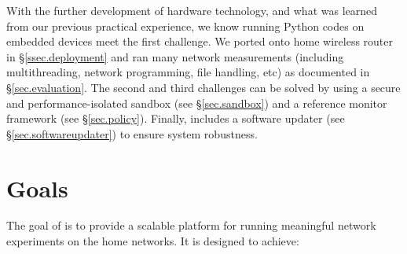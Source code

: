 With the further development of hardware technology, and what was learned from our previous practical experience, we know running Python codes on embedded devices meet the first challenge. We ported \sysname onto home wireless router in \S{\ref{ssec.deployment}} and ran many network measurements (including multithreading, network programming, file handling, etc) as documented in \S{\ref{sec.evaluation}}. The second and third challenges can be solved by using a secure and performance-isolated sandbox (see \S{\ref{sec.sandbox}}) and a reference monitor framework (see \S{\ref{sec.policy}}). Finally, \sysname includes a software updater (see \S{\ref{sec.softwareupdater}}) to ensure system robustness.

\section{Goals}
\label{ssec.goals}
The goal of \sysname is to provide a scalable platform for running meaningful network experiments on the home networks. It is designed to achieve:
